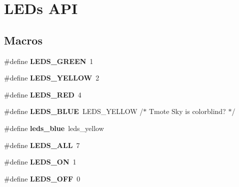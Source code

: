 \hypertarget{group__leds}{\section{L\-E\-Ds A\-P\-I}
\label{group__leds}
}
\subsection*{Macros}
\begin{DoxyCompactItemize}
\item 
\hypertarget{group__leds_ga23896f3557234decaa9414d3592e6aae}{\#define {\bfseries L\-E\-D\-S\-\_\-\-G\-R\-E\-E\-N}~1}\label{group__leds_ga23896f3557234decaa9414d3592e6aae}

\item 
\hypertarget{group__leds_gaeeb2388e5fb41bd26f5b6192e7d47d2b}{\#define {\bfseries L\-E\-D\-S\-\_\-\-Y\-E\-L\-L\-O\-W}~2}\label{group__leds_gaeeb2388e5fb41bd26f5b6192e7d47d2b}

\item 
\hypertarget{group__leds_ga5005bb516b2e0a4d6f18b343f9fe212f}{\#define {\bfseries L\-E\-D\-S\-\_\-\-R\-E\-D}~4}\label{group__leds_ga5005bb516b2e0a4d6f18b343f9fe212f}

\item 
\hypertarget{group__leds_ga4db9cce6e6b0910eb928d93e0d1dafd4}{\#define {\bfseries L\-E\-D\-S\-\_\-\-B\-L\-U\-E}~L\-E\-D\-S\-\_\-\-Y\-E\-L\-L\-O\-W	/$\ast$ Tmote Sky is colorblind? $\ast$/}\label{group__leds_ga4db9cce6e6b0910eb928d93e0d1dafd4}

\item 
\hypertarget{group__leds_gadd0a330871ce56c518732241abc2a8ee}{\#define {\bfseries leds\-\_\-blue}~leds\-\_\-yellow}\label{group__leds_gadd0a330871ce56c518732241abc2a8ee}

\item 
\hypertarget{group__leds_ga64c8bcabbf441dd1b338b1ed218f359c}{\#define {\bfseries L\-E\-D\-S\-\_\-\-A\-L\-L}~7}\label{group__leds_ga64c8bcabbf441dd1b338b1ed218f359c}

\item 
\hypertarget{group__leds_gadf5f4414a96691584101b67a7f4874b8}{\#define {\bfseries L\-E\-D\-S\-\_\-\-O\-N}~1}\label{group__leds_gadf5f4414a96691584101b67a7f4874b8}

\item 
\hypertarget{group__leds_gad2d280510beea8420eb2c66d227ea82b}{\#define {\bfseries L\-E\-D\-S\-\_\-\-O\-F\-F}~0}\label{group__leds_gad2d280510beea8420eb2c66d227ea82b}

\end{DoxyCompactItemize}
